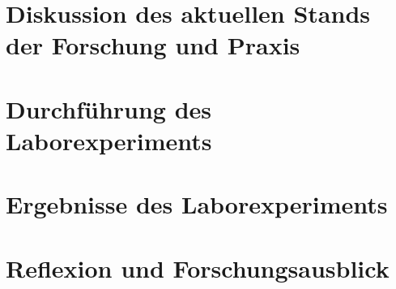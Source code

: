 \documentclass[a4paper,fontsize=11pt,oneside,parskip=half,headings=normal]{scrreprt}
\begin{document}



% 

\begin{spacing}{1}

  \tableofcontents
  \clearpage

  
  \clearpage

  \thispagestyle{kapitelkopfzeile}

  \listoffigures

  \clearpage

  \listoftables

  \cleardoublepage

\end{spacing}




\chapter{Diskussion des aktuellen Stands der Forschung und Praxis}
\chapter{Durchführung des Laborexperiments}
\chapter{Ergebnisse des Laborexperiments}
\chapter{Reflexion und Forschungsausblick}
\end{document}
